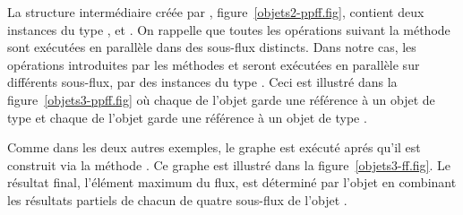 La structure interm\'ediaire cr\'e\'ee par , figure~\ref{objets2-ppff.fig}, contient deux instances du type ,  et . On rappelle que toutes les op\'erations suivant la m\'ethode sont ex\'ecut\'ees en parall\`ele dans des sous-flux distincts. Dans notre cas, les op\'erations introduites par les m\'ethodes  et  seront ex\'ecut\'ees en parall\`ele sur diff\'erents sous-flux, par des instances du type . Ceci est illustré dans la figure~\ref{objets3-ppff.fig} o\`u chaque  de l'objet  garde une r\'ef\'erence \`a un objet de type  et chaque  de l'objet  garde une r\'ef\'erence \`a un objet de type . 

Comme dans les deux autres exemples, le graphe  est ex\'ecut\'e apr\'es qu'il est construit via la m\'ethode . Ce graphe est illustré dans la figure~\ref{objets3-ff.fig}. Le r\'esultat final, l'\'el\'ement maximum du flux, est d\'etermin\'e par l'objet  en combinant les r\'esultats partiels de chacun de quatre sous-flux de l'objet .

